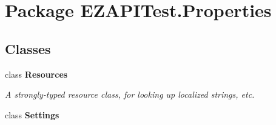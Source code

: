\hypertarget{namespace_e_z_a_p_i_test_1_1_properties}{\section{Package E\-Z\-A\-P\-I\-Test.\-Properties}
\label{namespace_e_z_a_p_i_test_1_1_properties}
}
\subsection*{Classes}
\begin{DoxyCompactItemize}
\item 
class {\bfseries Resources}
\begin{DoxyCompactList}\small\item\em A strongly-\/typed resource class, for looking up localized strings, etc. \end{DoxyCompactList}\item 
class {\bfseries Settings}
\end{DoxyCompactItemize}

